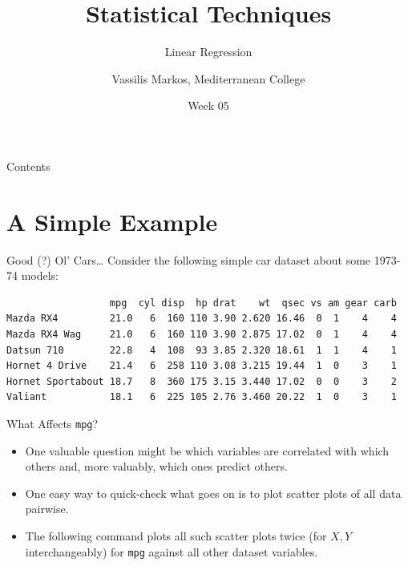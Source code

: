 \documentclass[aspectratio=169, 12pt, xcolor=table]{beamer}
\title{Statistical Techniques}
\subtitle{Linear Regression}
\date{Week 05}
\author{Vassilis Markos, Mediterranean College}
\begin{document}
	\begin{frame}
		\titlepage
	\end{frame}

	\begin{frame}{Contents}
		\tableofcontents
	\end{frame}

	\section{A Simple Example}\label{sec:descriptive-statistics}
	
	\sectionframe
	
	\begin{frame}[fragile]{Good (?) Ol' Cars\ldots}
		Consider the following simple car dataset about some 1973-74 models:
		
		
		
		\begin{small}
		\begin{verbatim}
                  mpg  cyl disp  hp drat    wt  qsec vs am gear carb
Mazda RX4         21.0   6  160 110 3.90 2.620 16.46  0  1    4    4
Mazda RX4 Wag     21.0   6  160 110 3.90 2.875 17.02  0  1    4    4
Datsun 710        22.8   4  108  93 3.85 2.320 18.61  1  1    4    1
Hornet 4 Drive    21.4   6  258 110 3.08 3.215 19.44  1  0    3    1
Hornet Sportabout 18.7   8  360 175 3.15 3.440 17.02  0  0    3    2
Valiant           18.1   6  225 105 2.76 3.460 20.22  1  0    3    1
\end{verbatim}
		\end{small}
	\end{frame}

	\begin{frame}{What Affects \texttt{mpg}?}
		\begin{itemize}
			\item One valuable question might be which variables are correlated with which others and, more valuably, which ones predict others.
			\item One easy way to quick-check what goes on is to plot scatter plots of all data pairwise.
			\item The following command plots all such scatter plots twice (for $X,Y$ interchangeably) for \texttt{mpg} against all other dataset variables.
		\end{itemize}
	
		
		
	\end{frame}
\end{document}
